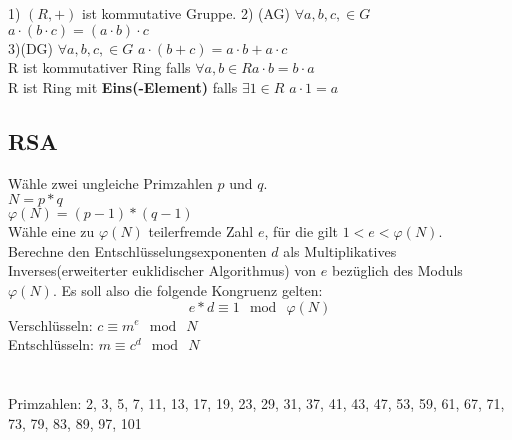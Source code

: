 \documentclass[11pt]{article}
\begin{document}
1) $(R,+)$ ist kommutative Gruppe. \hspace{2mm} 2) (AG) $\forall a,b,c, \in G$ \hspace{3mm} $a \cdot (b \cdot c) = (a \cdot b) \cdot c$ \\
3)(DG) $\forall a,b,c, \in G$ \hspace{3mm} $a \cdot (b + c) = a \cdot b + a \cdot c$\\
R ist kommutativer Ring falls $\forall a,b \in R$\hspace{3mm}$a \cdot b = b \cdot a$\\
R ist Ring mit {\bfseries Eins(-Element)} falls $\exists 1 \in R$\hspace{3mm} $a\cdot 1 = a$

\subsection{RSA}
W{\"a}hle zwei ungleiche Primzahlen $p$ und $q$.\\
$N=p * q$\\
$\varphi (N)=(p-1) * (q-1)$\\
W{\"a}hle eine zu $\varphi (N)$ teilerfremde Zahl $e$, f{\"u}r die gilt $1<e<\varphi (N)$.\\
Berechne den Entschl{\"u}sselungsexponenten $d$ als Multiplikatives Inverses(erweiterter euklidischer Algorithmus) von $e$ bez{\"u}glich des Moduls $\varphi (N)$. Es soll also die folgende Kongruenz gelten: $$ e * d\equiv 1\ {\bmod \ }\varphi (N)$$
Verschl{\"u}sseln: $c\equiv m^{e}\ {\bmod \ }N$\\
Entschl{\"u}sseln: $m\equiv c^{d}\ {\bmod \ }N$\\\\\\
Primzahlen: 2, 3, 5, 7, 11, 13, 17, 19, 23, 29, 31, 37, 41, 43, 47, 53, 59, 61, 67, 71, 73, 79, 83, 89, 97, 101
    
\end{document}
